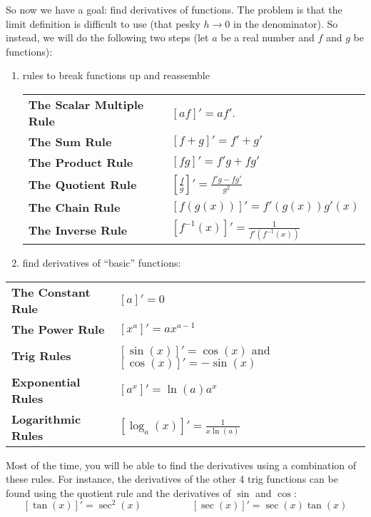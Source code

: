 So now we have a goal: find derivatives of functions. The problem is that the limit definition is difficult to use (that pesky $h\to 0$ in the denominator). So instead, we will do the following two steps (let $a$ be a real number and $f$ and $g$ be functions):
\begin{enumerate}
\item rules to break functions up and reassemble

\begin{center}
\def\arraystretch{1.5}
\begin{tabular}{@{}ll@{}}
\toprule[0.4mm]
\textbf{The Scalar Multiple Rule} & $[af]' = af'$. \\
\textbf{The Sum Rule} & $[f + g]' = f' + g'$ \\
\textbf{The Product Rule} & $[fg]' = f'g + fg'$ \\
\textbf{The Quotient Rule} & $\left[\frac{f}{g}\right]' = \frac{f'g - fg'}{g^2}$ \\
\textbf{The Chain Rule} & $[f(g(x))]' = f'(g(x))g'(x)$ \\
\textbf{The Inverse Rule} & $[f^{-1}(x)]' = \frac{1}{f'(f^{-1}(x))}$ \\
\bottomrule[0.4mm]
\end{tabular}
\end{center}

\item find derivatives of ``basic'' functions:

\end{enumerate}


\begin{center}
\def\arraystretch{1.5}
\begin{tabular}{@{}ll@{}}
\toprule[0.4mm]
\textbf{The Constant Rule}     & $[a]' = 0$ \\
\textbf{The Power Rule}        & $[x^a]' = ax^{a-1}$ \\
\textbf{Trig Rules}  & $[\sin(x)]' = \cos(x)$ and $[\cos(x)]' = -\sin(x)$ \\
\textbf{Exponential Rules} & $[a^x]' = \ln(a)a^x$ \\
\textbf{Logarithmic Rules} & $[\log_a(x)]' = \frac{1}{x\ln(a)}$ \\
\bottomrule[0.4mm]
\end{tabular}
\end{center}


Most of the time, you will be able to find the derivatives using a combination of these rules. For instance, the derivatives of the other 4 trig functions can be found using the quotient rule and the derivatives of $\sin$ and $\cos$:
$$[\tan(x)]' = \sec^2(x)
\quad\quad\quad\quad\quad
[\sec(x)]' = \sec(x)\tan(x)$$


